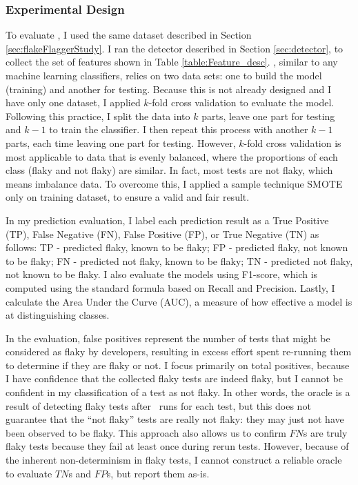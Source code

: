 \subsubsection{Experimental Design}
\label{sec:Prediction_Design}
To evaluate \sysName, I used the same dataset described in Section \ref{sec:flakeFlaggerStudy}. I ran the detector described in Section \ref{sec:detector}, to collect the set of features shown in Table \ref{table:Feature_desc}. \sysName, similar to any machine learning classifiers, relies on two data sets: one to build the model (training) and another for testing. Because this is not already designed and I have only one dataset, I applied $k$-fold cross validation \cite{kohavi1995study} to evaluate the model. Following this practice, I split the data into $k$ parts, leave one part for testing and $k-1$ to train the classifier.
I then repeat this process with another $k-1$ parts, each time leaving one part for testing.
However, $k$-fold cross validation is most applicable to data that is evenly balanced, where the proportions of each class (flaky and not flaky) are similar. In fact, most tests are not flaky, which means imbalance data. To overcome this, I applied a sample technique SMOTE \cite{SMOTE} only on training dataset, to ensure a valid and fair result.



In my prediction evaluation, I label each prediction result as a True Positive (TP), False Negative (FN), False Positive (FP), or True Negative (TN) as follows:
TP - predicted flaky, known to be flaky; FP - predicted flaky, not known to be flaky; FN - predicted not flaky, known to be flaky; TN - predicted not flaky, not known to be flaky.
I also evaluate the models using F1-score, which is computed using the standard formula based on Recall and Precision. %
Lastly, I calculate the Area Under the Curve (AUC), a measure of how effective a model is at distinguishing classes.

In the evaluation, false positives represent the number of tests that might be considered as flaky by developers, resulting in excess effort spent re-running them to determine if they are flaky or not. I focus primarily on total positives, because I have confidence that the collected flaky tests are indeed flaky, but I cannot be confident in my classification of a test as not flaky. 
In other words, the oracle is a result of detecting flaky tests after \numruns~runs for each test, but this does not guarantee that the ``not flaky'' tests are really not flaky: they may just not have been observed to be flaky. 
This approach also allows us to confirm $FN$s are truly flaky tests because they fail at least once during rerun tests.
However, because of the inherent non-determinism in flaky tests, I cannot construct a reliable oracle to evaluate $TN$s and $FP$s, but report them as-is.



